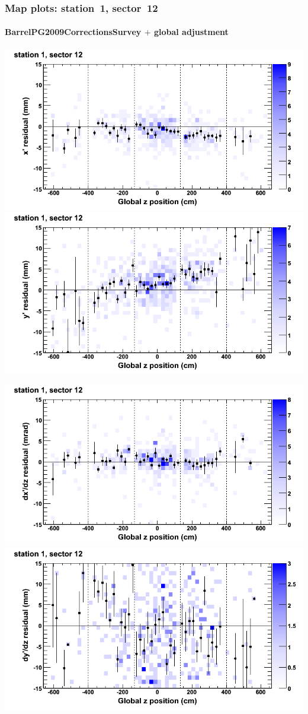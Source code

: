 \documentclass[compress]{beamer}
\begin{document}
\begin{frame}
\frametitle{Map plots: station~1, sector~12}
\framesubtitle{BarrelPG2009CorrectionsSurvey $+$ global adjustment}
\includegraphics[width=0.5\linewidth]{mapplots_re01/DTvsz_st1sec12_x.png}
\includegraphics[width=0.5\linewidth]{mapplots_re01/DTvsz_st1sec12_y.png}

\includegraphics[width=0.5\linewidth]{mapplots_re01/DTvsz_st1sec12_dxdz.png}
\includegraphics[width=0.5\linewidth]{mapplots_re01/DTvsz_st1sec12_dydz.png}
\end{frame}
\end{document}

